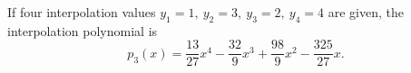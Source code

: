 \documentclass[preprint,12pt]{elsarticle}
\begin{document}

If four interpolation values $y_1=1,\  y_2=3,\ y_3=2, \ y_4=4$ are given, the interpolation polynomial is
\begin{displaymath}
p_3(x)=\frac{13}{27}x^4-\frac{32}{9}x^3+\frac{98}{9}x^2-\frac{325}{27}x.
\end{displaymath}
\end{document}
